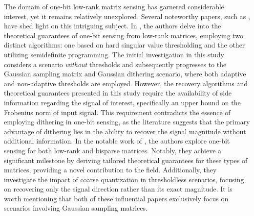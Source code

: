 \documentclass[12pt,draftcls,onecolumn]{IEEEtran}
\begin{document}
The domain of one-bit low-rank matrix sensing has garnered considerable interest, yet it remains relatively unexplored. Several noteworthy papers, such as \cite{foucart2019recovering, foucart2019one}, have shed light on this intriguing subject. In \cite{foucart2019recovering}, the authors delve into the theoretical guarantees of one-bit sensing from low-rank matrices, employing two distinct algorithms: one based on hard singular value thresholding and the other utilizing semidefinite programming.
The initial investigation in this study considers a scenario \emph{without} thresholds and subsequently progresses to the Gaussian sampling matrix and Gaussian dithering scenario, where both adaptive and non-adaptive thresholds are employed. However, the recovery algorithms and theoretical guarantees presented in this study require the availability of side information regarding the signal of interest, specifically an upper bound on the Frobenius norm of input signal. This requirement contradicts the essence of employing dithering in one-bit sensing, as the literature suggests that the primary advantage of dithering lies in the ability to recover the signal magnitude without additional information. In the notable work of \cite{foucart2019one}, the authors explore one-bit sensing for both low-rank and bisparse matrices. Notably, they achieve a significant milestone by deriving tailored theoretical guarantees for these types of matrices, providing a novel contribution to the field. Additionally, they investigate the impact of coarse quantization in thresholdless scenarios, focusing on recovering only the signal direction rather than its exact magnitude. It is worth mentioning that both of these influential papers exclusively focus on scenarios involving Gaussian sampling matrices.
\end{document}
